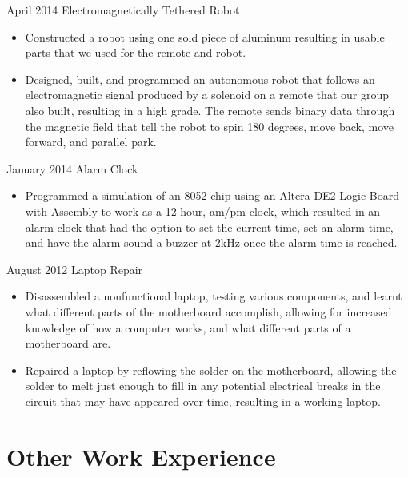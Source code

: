 \documentclass[]{friggeri-cv} %
\begin{document}
\begin{entrylist}

\entry
{April 2014}
{Electromagnetically Tethered Robot}
{}
{
\begin{itemize}
\item Constructed a robot using one sold piece of aluminum resulting in usable parts
that we used for the remote and
robot.
\item Designed, built, and programmed an autonomous robot that follows an
electromagnetic signal produced by a
solenoid on a remote that our group also built, resulting in a high grade. The
remote sends binary data through
the magnetic field that tell the robot to spin 180 degrees, move back, move
forward, and parallel park.
\end{itemize}
}
\entry
{January 2014}
{Alarm Clock}
{}
{
\begin{itemize}
\item Programmed a simulation of an 8052 chip using an Altera DE2 Logic Board with
Assembly to work as a 12-hour,
am/pm clock, which resulted in an alarm clock that had the option to set the
current time, set an alarm time, and
have the alarm sound a buzzer at 2kHz once the alarm time is reached.
\end{itemize}
}
\entry
{August 2012}
{Laptop Repair}
{}
{
\begin{itemize}
\item Disassembled a nonfunctional laptop, testing various components, and learnt what
different parts of the
motherboard accomplish, allowing for increased knowledge of how a computer
works, and what different parts of
a motherboard are.
\item Repaired a laptop by reflowing the solder on the motherboard, allowing the
solder to melt just enough to fill in
any potential electrical breaks in the circuit that may have appeared over time,
resulting in a working laptop.
\end{itemize}
}
\end{entrylist}

\section{Other Work Experience}
\end{document}
